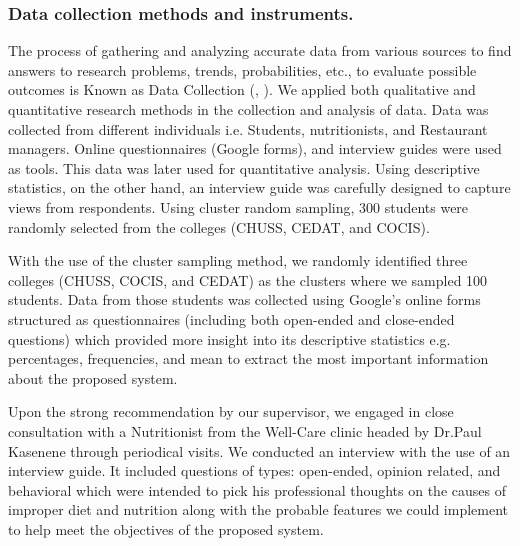 \documentclass{article}
\begin{document}
\subsubsection{Data collection methods and instruments.}
The process of gathering and analyzing accurate data from various sources to find answers to research problems, trends, probabilities, etc., to evaluate possible outcomes is Known as Data Collection (\citeauthor{Simplelearn}, \citeyear{Simplelearn}). We applied both qualitative and quantitative research methods in the collection and analysis of data. Data was collected from different individuals i.e. Students, nutritionists, and Restaurant managers. Online questionnaires (Google forms), and interview guides were used as tools. This data was later used for quantitative analysis.
Using descriptive statistics, on the other hand, an interview guide was carefully designed to capture views from respondents.
Using cluster random sampling, 300 students were randomly selected from the colleges (CHUSS, CEDAT, and COCIS).

\vspace{10pt}

\noindent With the use of the cluster sampling method, we randomly identified three colleges (CHUSS, COCIS, and CEDAT) as the clusters where we sampled 100 students. Data from those students was collected using Google's online forms structured as questionnaires (including both open-ended and close-ended questions) which provided more insight into its descriptive statistics e.g. percentages, frequencies, and mean to extract the most important information about the proposed system.
\vspace{10pt}

\noindent Upon the strong recommendation by our supervisor, we engaged in close consultation with a Nutritionist from the Well-Care clinic headed by Dr.Paul Kasenene through periodical visits.
We conducted an interview with the use of an interview guide. It included questions of types:  open-ended, opinion related, and behavioral which were intended to pick his professional thoughts on the causes of improper diet and nutrition along with the probable features we could implement to help meet the objectives of the proposed system.

\vspace{10pt}
\end{document}
